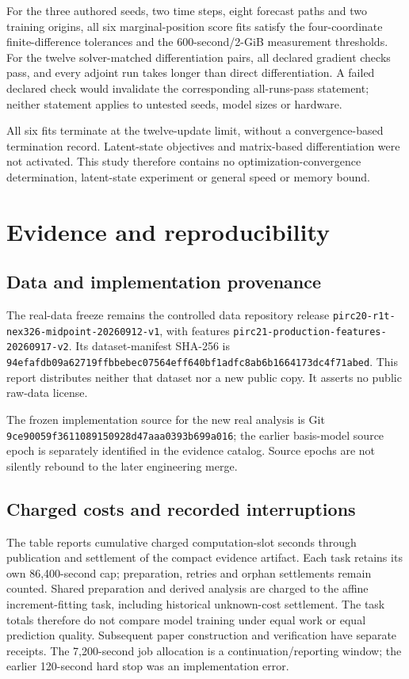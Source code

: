 \documentclass[11pt]{article}
\newcommand{\tabfile}[1]{\begin{center}\resizebox{\textwidth}{!}{}\end{center}}
\begin{document}
For the three authored seeds, two time steps, eight forecast paths and two training origins, all six marginal-position score fits satisfy the four-coordinate finite-difference tolerances and the 600-second/2-GiB measurement thresholds. For the twelve solver-matched differentiation pairs, all declared gradient checks pass, and every adjoint run takes longer than direct differentiation. A failed declared check would invalidate the corresponding all-runs-pass statement; neither statement applies to untested seeds, model sizes or hardware.

All six fits terminate at the twelve-update limit, without a convergence-based termination record. Latent-state objectives and matrix-based differentiation were not activated. This study therefore contains no optimization-convergence determination, latent-state experiment or general speed or memory bound.

\appendix
\section{Evidence and reproducibility}\label{sec:appendix}
\subsection{Data and implementation provenance}\label{sec:provenance}
The real-data freeze remains the controlled data repository release \nolinkurl{pirc20-r1t-nex326-midpoint-20260912-v1}, with features \nolinkurl{pirc21-production-features-20260917-v2}. Its dataset-manifest SHA-256 is \nolinkurl{94efafdb09a62719ffbbebec07564eff640bf1adfc8ab6b1664173dc4f71abed}. This report distributes neither that dataset nor a new public copy. It asserts no public raw-data license.

The frozen implementation source for the new real analysis is Git \nolinkurl{9ce90059f3611089150928d47aaa0393b699a016}; the earlier basis-model source epoch is separately identified in the evidence catalog. Source epochs are not silently rebound to the later engineering merge.

\subsection{Charged costs and recorded interruptions}\label{sec:repro}
\tabfile{costs.tex}
The table reports cumulative charged computation-slot seconds through publication and settlement of the compact evidence artifact. Each task retains its own 86,400-second cap; preparation, retries and orphan settlements remain counted. Shared preparation and derived analysis are charged to the affine increment-fitting task, including historical unknown-cost settlement. The task totals therefore do not compare model training under equal work or equal prediction quality. Subsequent paper construction and verification have separate receipts. The 7,200-second job allocation is a continuation/reporting window; the earlier 120-second hard stop was an implementation error.
\end{document}
